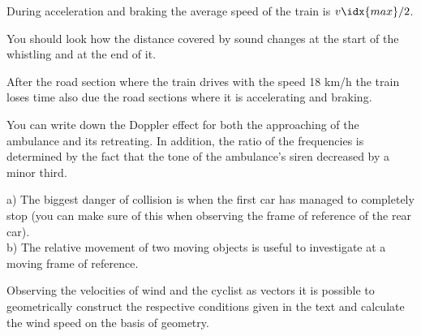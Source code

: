 \documentclass[11pt]{article}
\begin{document}

\hinteng
During acceleration and braking the average speed of the train is $v\idx{max}/2$.
\probend
\bigskip


\hinteng
You should look how the distance covered by sound changes at the start of the whistling and at the end of it.
\probend
\bigskip


\hinteng
After the road section where the train drives with the speed 18 km/h the train loses time also due the road sections where it is accelerating and braking.
\probend
\bigskip


\hinteng
You can write down the Doppler effect for both the approaching of the ambulance and its retreating. In addition, the ratio of the frequencies is determined by the fact that the tone of the ambulance’s siren decreased by a minor third.
\probend
\bigskip


\hinteng
a) The biggest danger of collision is when the first car has managed to completely stop (you can make sure of this when observing the frame of reference of the rear car).\\
b) The relative movement of two moving objects is useful to investigate at a moving frame of reference.
\probend
\bigskip


\hinteng
Observing the velocities of wind and the cyclist as vectors it is possible to geometrically construct the respective conditions given in the text and calculate the wind speed on the basis of geometry.
\probend
\bigskip
\end{document}
